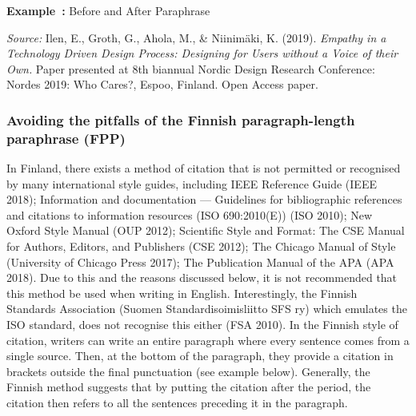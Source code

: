 \documentclass[english, 12pt, a4paper, elec, utf8, a-2b, online]{aaltothesis}
\begin{document}
\vspace{1em}
\noindent
{}
\textsf{\textbf{Example~\theexample:}} Before and After Paraphrase

\vspace{1ex}
\noindent
{}

\vspace{1ex}
\noindent
\textit{Source:} Ilen, E., Groth, G., Ahola, M., \& Niinimäki, K. (2019). 
\textit{Empathy in a Technology Driven Design Process: Designing for Users 
	without a Voice of their Own.} Paper presented at 8th biannual Nordic Design
	Research Conference: Nordes 2019: Who Cares?, Espoo, Finland. Open Access 
	paper.


\subsubsection*{Avoiding the pitfalls of the Finnish paragraph-length paraphrase
	 (FPP)}

In Finland, there exists a method of citation that is not permitted or 
recognised by many international style guides, including IEEE Reference Guide 
(IEEE 2018); Information and documentation --- Guidelines for bibliographic 
references and citations to information resources (ISO 690:2010(E)) (ISO 2010); 
New Oxford Style Manual (OUP 2012); Scientific Style and Format: The CSE Manual 
for Authors, Editors, and Publishers (CSE 2012); The Chicago Manual of Style 
(University of Chicago Press 2017); The Publication Manual of the APA (APA 
2018). Due to this and the reasons discussed below, it is not recommended that 
this method be used when writing in English. Interestingly, the Finnish 
Standards Association (Suomen Standardisoimisliitto SFS ry) which emulates the 
ISO standard, does not recognise this either (FSA 2010). In the Finnish style of
citation, writers can write an entire paragraph where every sentence comes from 
a single source. Then, at the bottom of the paragraph, they provide a citation 
in brackets outside the final punctuation (see example below). Generally, the 
Finnish method suggests that by putting the citation after the period, the 
citation then refers to all the sentences preceding it in the paragraph.
\end{document}
